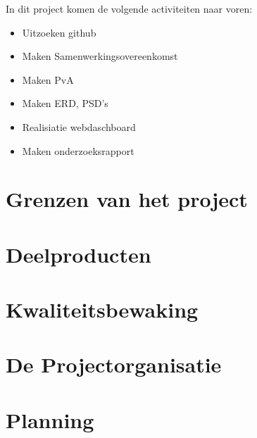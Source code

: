 \documentclass[11pt]{article}
\begin{document}
\begin{flushleft}
	
	In dit project komen de volgende activiteiten naar voren:
	
	
	\begin{itemize}
		
		\item Uitzoeken github
		\item Maken Samenwerkingsovereenkomst
		\item Maken PvA
		\item Maken ERD, PSD's
		\item Realisiatie webdaschboard
		\item Maken onderzoeksrapport
	\end{itemize}
	
\end{flushleft}

	
	

\newpage
\section[Grenzen] {Grenzen van het project}
\newpage
\section{Deelproducten}
\newpage
\section{Kwaliteitsbewaking}
\newpage
\section{De Projectorganisatie}
\newpage
\section{Planning}
\end{document}
